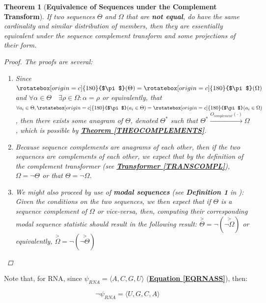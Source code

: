 \documentclass[a4paper, 18pt]{book} %
\newtheorem{theo}{Theorem}
\newcommand{\invpi}{\rotatebox[origin=c]{180}{$\pi$}}
\begin{document}
\begin{theo}[\textbf{Equivalence of Sequences under the Complement Transform}]
\label{THEOCOMPEQUIV}
If two sequences $\Theta$ and $\Omega$ that are \textbf{not equal}, do have the same cardinality and similar distribution of members, then they are essentially equivalent under the sequence complement transform and some projections of their form.

\begin{proof}
The proofs are several:
\begin{enumerate}
\item Since $\invpi(\Theta) = \invpi(\Omega)$ and $\forall \alpha \in \Theta \quad \exists \rho \in \Omega: \alpha = \rho$ or equivalently, that $\forall a_i \in \Theta, \invpi(a_i \in \Theta) = \invpi(a_i \in \Omega)$, then there exists some anagram of $\Theta$, denoted $\Theta^*$ such that $\Theta^* \xrightarrow{O_{complement}(\cdot)} \Omega$, which is possible by \textbf{\hyperref[THEOCOMPLEMENTS]{Theorem \ref{THEOCOMPLEMENTS}}}.
\item Because sequence complements are anagrams of each other, then if the two sequences are complements of each other, we expect that by the definition of the complement transformer (see \textbf{\hyperref[TRANSCOMPL]{Transformer \ref{TRANSCOMPL}}}), $\Omega = \lnot\Theta$ or that $\Theta = \lnot\Omega$.
\item We might also proceed by use of \textbf{modal sequences} (see \textbf{Definition 1} in \cite{transformatics}): Given the conditions on the two sequences, we then expect that if $\Theta$ is a sequence complement of $\Omega$ or vice-versa, then, computing their corresponding modal sequence statistic should result in the following result: $\overset{>}{\Theta} = \lnot(\overset{>}{\lnot\Omega})$ or equivalently, $\overset{>}{\Omega} = \lnot(\overset{>}{\lnot\Theta})$
\end{enumerate}
\end{proof}

\end{theo}

\vspace{2em}

Note that, for RNA, since $\psi_{RNA} = \langle A, C, G, U \rangle$ (\textbf{\hyperref[EQRNASS]{Equation \ref{EQRNASS}}}), then: 

\vspace{1em}

\begin{equation}
\label{EQRNACOMP}
\lnot\psi_{RNA} = \langle U, G, C, A \rangle
\end{equation}
\end{document}
